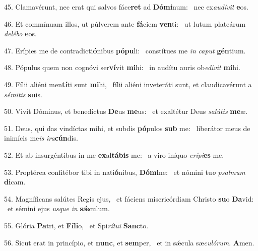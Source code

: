 45. Clamavérunt, nec erat qui salvos fáce\textbf{ret} ad \textbf{Dó}\textbf{mi}num: \ast\  nec ex\textit{au}\textit{dí}\textit{vit} \textbf{e}os.\

46. Et commínuam illos, ut púlverem ante \textbf{fá}ciem \textbf{ven}ti: \ast\  ut lutum plateárum \textit{de}\textit{lé}\textit{bo} \textbf{e}os.\

47. Erípies me de contradicti\textbf{ó}nibus \textbf{pó}\textbf{pu}li: \ast\  constítues me \textit{in} \textit{ca}\textit{put} \textbf{gén}tium.\

48. Pópulus quem non cognóvi ser\textbf{ví}vit \textbf{mi}hi: \ast\  in audítu auris ob\textit{e}\textit{dí}\textit{vit} \textbf{mi}hi.\

49. Fílii aliéni men\textbf{tí}ti sunt \textbf{mi}hi, \ast\  fílii aliéni inveteráti sunt, et claudicavérunt a \textit{sé}\textit{mi}\textit{tis} \textbf{su}is.\

50. Vivit Dóminus, et benedíctus \textbf{De}us \textbf{me}us: \ast\  et exaltétur Deus \textit{sa}\textit{lú}\textit{tis} \textbf{me}æ.\

51. Deus, qui das vindíctas mihi, et subdis \textbf{pó}pulos \textbf{sub} me: \ast\  liberátor meus de inimícis me\textit{is} \textit{i}\textit{ra}\textbf{cún}dis.\

52. Et ab insurgéntibus in me \textbf{ex}al\textbf{tá}\textbf{bis} me: \ast\  a viro iníquo \textit{e}\textit{rí}\textit{pi}\textbf{es} me.\

53. Proptérea confitébor tibi in nati\textbf{ó}nibus, \textbf{Dó}\textbf{mi}ne: \ast\  et nómini tu\textit{o} \textit{psal}\textit{mum} \textbf{di}cam.\

54. Magníficans salútes Regis ejus, \dag\  et fáciens misericórdiam Christo \textbf{su}o \textbf{Da}vid: \ast\  et sémini ejus \textit{us}\textit{que} \textit{in} \textbf{sǽ}culum.\

55. Glória \textbf{Pa}tri, et \textbf{Fí}\textbf{li}o, \ast\  et Spi\textit{rí}\textit{tu}\textit{i} \textbf{Sanc}to.\

56. Sicut erat in princípio, et \textbf{nunc}, et \textbf{sem}per, \ast\  et in sǽcula sæ\textit{cu}\textit{ló}\textit{rum}. \textbf{A}men.\

